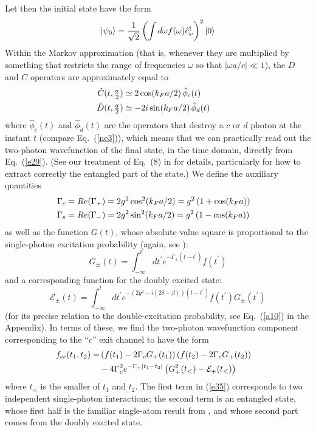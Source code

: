 \documentclass[aps,pra,twocolumn,floatfix,superscriptaddress]{revtex4}
\begin{document}
Let then the initial state have the form
\begin{equation}
|\psi_0\rangle = \frac{1}{\sqrt 2} \left(\int d\omega  f(\omega) \hat c_\omega^\dagger \right)^2|0\rangle
\label{e30}
\end{equation}
Within the Markov approximation (that is, whenever they are multiplied by something that restricts the range of frequencies $\omega$ so that $|\omega a/c|\ll 1$), the $D$ and $C$ operators are approximately equal to
\begin{align}
\hat C(t,\tfrac{a}{2}) &\simeq 2\cos(k_Fa/2) \,\hat\phi_c(t) \cr
\hat D(t,\tfrac{a}{2}) &\simeq -2i\sin(k_Fa/2)\, \hat\phi_d(t)
\end{align}
where $\hat\phi_c(t)$ and $\hat\phi_d(t)$ are the operators that destroy a $c$ or $d$ photon at the instant $t$ (compare Eq.~(\ref{ne3})),  which means that we can practically read out the two-photon wavefunction of the final state, in the time domain, directly from Eq.~(\ref{e29}).  (See our treatment of Eq.~(8) in \cite{us} for details, particularly for how to extract correctly the entangled part of the state.) We define the auxiliary quantities
\begin{align}
\Gamma_c &= Re(\Gamma_+) = 2g^2\cos^2(k_F a/2) = g^2\left(1+\cos(k_F a)\right) \cr
\Gamma_s &= Re(\Gamma_-) = 2g^2\sin^2(k_F a/2) = g^2\left(1-\cos(k_F a)\right)
\end{align}
as well as the function $G(t)$, whose absolute value square is proportional to the single-photon excitation probability (again, see \cite{us}):
\begin{equation}
G_\pm(t)= \int_{-\infty}^{t}dt^{\prime} e^{-\Gamma_\pm(t- t^{\prime})} f(t^{\prime} )
\end{equation}
and a corresponding function for the doubly excited state:
\begin{equation}
\mathcal{E}_\pm(t)=\int_{-\infty}^{t} d t^{\prime}e^{-(2g^2-i( 2\delta-\beta ))(t- t^{\prime})}  f(t^{\prime})G_\pm(t^{\prime})
\label{e34}
\end{equation}
(for its precise relation to the double-excitation probability, see Eq.~(\ref{a10}) in the Appendix). In terms of these, we find the two-photon wavefunction component corresponding to the ``$c$'' exit channel to have the form
\begin{align}
f_{cc}(t_1,t_2)= &\left(f(t_1)-2 \Gamma_{c} G_+(t_1)\right)\left(f(t_2)-2 \Gamma_{c} G_+(t_2)\right)\cr
&-4  \Gamma_{c}^2 e^{-\Gamma_{+} |t_1-t_2|}\left(G_+^2(t_<)-\mathcal{E}_+(t_<) \right)
\label{e35}
\end{align}
where $t_<$ is the smaller of $t_1$ and $t_2$.  The first term in (\ref{e35}) corresponds to two independent single-photon interactions; the second term is an entangled state, whose first half is the familiar single-atom result from \cite{us}, and whose second part comes from the doubly excited state.
\end{document}
